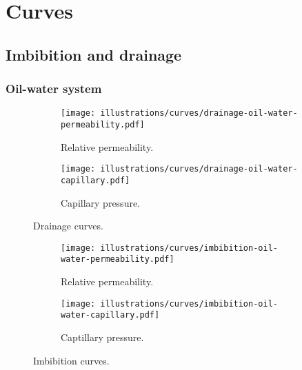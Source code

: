 
\section{Curves} %
\label{sec:curves}

\subsection{Imbibition and drainage} %
\label{sub:imbibition_and_drainage}

\subsubsection{Oil-water system} %
\label{ssub:oil_water_system}

\begin{figure}[H]
    \centering
    \begin{subfigure}[b]{0.45\textwidth}
            \texttt{[image: illustrations/curves/drainage-oil-water-permeability.pdf]}
            \caption{Relative permeability.}
            \label{fig:gull}
    \end{subfigure}%
    \quad
    \begin{subfigure}[b]{0.45\textwidth}
            \texttt{[image: illustrations/curves/drainage-oil-water-capillary.pdf]}
            \caption{Capillary pressure.}
            \label{fig:tiger}
    \end{subfigure}
    \caption{Drainage curves.}
\end{figure}


\begin{figure}[H]
    \centering
    \begin{subfigure}[b]{0.45\textwidth}
            \texttt{[image: illustrations/curves/imbibition-oil-water-permeability.pdf]}
            \caption{Relative permeability.}
            \label{fig:imb_oil_w_perm}
    \end{subfigure}%
    \quad
    \begin{subfigure}[b]{0.45\textwidth}
            \texttt{[image: illustrations/curves/imbibition-oil-water-capillary.pdf]}
            \caption{Captillary pressure.}
            \label{fig:imb_oil_water_perm}
    \end{subfigure}
    \caption{Imbibition curves.}
\end{figure}



